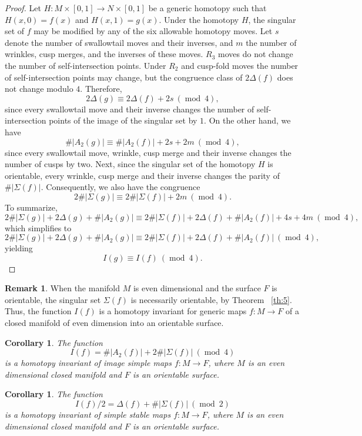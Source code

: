 \documentclass[12pt]{amsart}
\def\co{\colon}
\def\mod{{\mathop\mathrm{mod}\ }}
\newtheorem{corollary}[theorem]{Corollary}
\theoremstyle{definition}
\newtheorem{remark}[theorem]{Remark}
\begin{document}
{\begin{proof}  Let $H\co M\times [0,1]\to N\times [0,1]$ be a generic homotopy such that $H(x,0) = f(x)$ and $H(x,1) = g(x)$.  Under the homotopy $H$,  the singular set of $f$ may be modified by any of the six allowable homotopy moves.  Let $s$ denote the number of swallowtail moves and their inverses,  and $m$ the number of wrinkles, cusp merges,  and the inverses of these  moves. $R_3$ moves do not change the number of self-intersection points.  Under $R_2$ and cusp-fold moves the number of self-intersection points may change, but the congruence class of $2\Delta(f)$ does not change modulo $4$. Therefore, 
\[
2\Delta(g)\equiv 2\Delta(f)+2s ~(\mod 4),
\]
since every swallowtail move and their inverse changes the number of self-intersection points of the image of the singular set by $1$.  On the other hand, we have 
\[
\#|A_2(g)| \equiv \#|A_2(f)|+2s+2m  ~(\mod 4),
\]
since every swallowtail move, wrinkle, cusp merge and their inverse changes the number of cusps by two.  Next, since the singular set of the homotopy $H$ is orientable, every wrinkle, cusp merge and their inverse changes the parity of $\#|\Sigma(f)|$.  Consequently, we also have the congruence 
\[
2\#|\Sigma(g)|\equiv 2\#|\Sigma(f)|+ 2m ~(\mod 4).
\]
To summarize, 
\[
     2\#|\Sigma(g)| + 2\Delta(g) + \#|A_2(g)| \equiv 2\#|\Sigma(f)|+ 2\Delta(f)+ \#|A_2(f)|+4s +4m ~ (\mod 4),
\]
which simplifies to 
\[
     2\#|\Sigma(g)| + 2\Delta(g) + \#|A_2(g)| \equiv 2\#|\Sigma(f)|+  2\Delta(f) + \#|A_2(f)| ~(\mod 4),
\]
yielding 
\[
   I(g) \equiv I(f) ~(\mod 4).
\]
\end{proof}


\begin{remark}\label{rmk:1}
When the manifold $M$ is even dimensional and the surface $F$ is orientable, the singular set $\Sigma(f)$ is necessarily orientable,  by Theorem ~\ref{th:5}.  Thus,  the function $I(f)$ is a homotopy invariant for generic maps $f:M \rightarrow F$ of a closed manifold of even dimension into an orientable surface. 
\end{remark}


\begin{corollary} The function 
\[
I(f)= \#|A_2(f)| +  2\#|\Sigma(f)| ~(\mod 4)
\] 
is a homotopy invariant of image simple maps $f:M \rightarrow F$, where $M$ is an even dimensional closed manifold and $F$ is an orientable surface. 
\end{corollary}

\begin{corollary} \label{cor:11.3}
The function 
\[
I(f)/2=  \Delta(f)  +  \#|\Sigma(f)| ~(\mod 2)
\] 
is a homotopy invariant of simple stable maps $f:M \rightarrow F$, where $M$ is an even dimensional closed manifold and $F$ is an orientable surface.  
\end{corollary}

}
\end{document}
